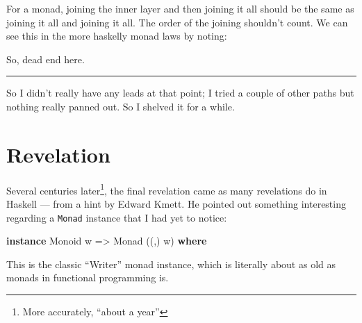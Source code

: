 \documentclass[]{article}
\newenvironment{Shaded}{}{}
\newcommand{\DataTypeTok}[1]{\textcolor[rgb]{0.56,0.13,0.00}{#1}}
\newcommand{\DecValTok}[1]{\textcolor[rgb]{0.25,0.63,0.44}{#1}}
\newcommand{\FunctionTok}[1]{\textcolor[rgb]{0.02,0.16,0.49}{#1}}
\newcommand{\KeywordTok}[1]{\textcolor[rgb]{0.00,0.44,0.13}{\textbf{#1}}}
\newcommand{\NormalTok}[1]{#1}
\newcommand{\OperatorTok}[1]{\textcolor[rgb]{0.40,0.40,0.40}{#1}}
\newcommand{\OtherTok}[1]{\textcolor[rgb]{0.00,0.44,0.13}{#1}}
\begin{document}
\begin{itemize}
  For a monad, joining the inner layer and then joining it all should be the
  same as joining it all and joining it all. The order of the joining shouldn't
  count. We can see this in the more haskelly monad laws by noting:

\begin{Shaded}
\end{Shaded}

  So, dead end here.
\end{itemize}

\begin{center}\rule{0.5\linewidth}{\linethickness}\end{center}

So I didn't really have any leads at that point; I tried a couple of other paths
but nothing really panned out. So I shelved it for a while.

\hypertarget{revelation}{%
\section{Revelation}\label{revelation}}

Several centuries later\footnote{More accurately, ``about a year''}, the final
revelation came as many revelations do in Haskell --- from a hint by Edward
Kmett. He pointed out something interesting regarding a \texttt{Monad} instance
that I had yet to notice:

\begin{Shaded}
\begin{Highlighting}[]
\KeywordTok{instance} \DataTypeTok{Monoid}\NormalTok{ w }\OtherTok{=>} \DataTypeTok{Monad}\NormalTok{ ((,) w) }\KeywordTok{where}
\end{Highlighting}
\end{Shaded}

This is the classic ``Writer'' monad instance, which is literally about as old
as monads in functional programming is.
\end{document}
